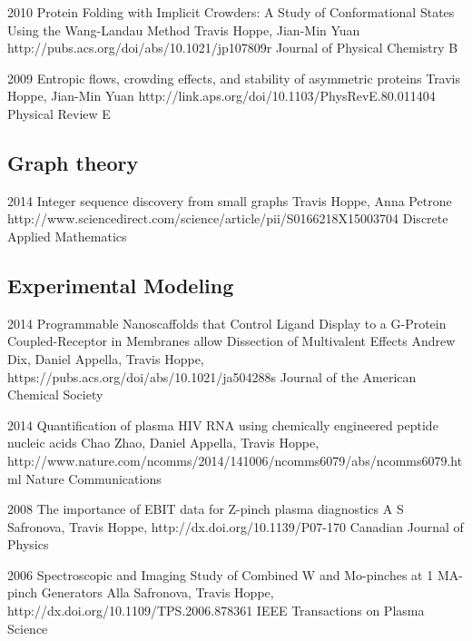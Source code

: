 \documentclass[]{scrartcl}
\begin{document}
\begin{cleanCV}
\Paper
{2010}
{Protein Folding with Implicit Crowders: 
  A Study of Conformational States Using the Wang-Landau Method}
{Travis Hoppe, Jian-Min Yuan}
{http://pubs.acs.org/doi/abs/10.1021/jp107809r}
{Journal of Physical Chemistry B}


\Paper
{2009}
{Entropic flows, crowding effects, and stability of asymmetric proteins}
{Travis Hoppe, Jian-Min Yuan}
{http://link.aps.org/doi/10.1103/PhysRevE.80.011404}
{Physical Review E}


\subsection{Graph theory}

\Paper
{2014}
{Integer sequence discovery from small graphs}
{Travis Hoppe, Anna Petrone}
{http://www.sciencedirect.com/science/article/pii/S0166218X15003704}
{Discrete Applied Mathematics}

\subsection{Experimental Modeling}

\Paper
{2014}
{Programmable Nanoscaffolds that Control Ligand Display to a G-Protein Coupled-Receptor in Membranes allow Dissection of Multivalent Effects}
{Andrew Dix, Daniel Appella, Travis Hoppe, \etal}
{https://pubs.acs.org/doi/abs/10.1021/ja504288s}
{Journal of the American Chemical Society}

\Paper
{2014}
{Quantification of plasma HIV RNA using chemically engineered peptide nucleic acids}
{Chao Zhao, Daniel Appella, Travis Hoppe, \etal}
{http://www.nature.com/ncomms/2014/141006/ncomms6079/abs/ncomms6079.html}
{Nature Communications}

\Paper
{2008}
{The importance of EBIT data for Z-pinch plasma diagnostics}
{A S Safronova, Travis Hoppe, \etal}
{http://dx.doi.org/10.1139/P07-170}
{Canadian Journal of Physics}

\Paper
{2006}
{Spectroscopic and Imaging Study of Combined W and Mo-pinches 
  at 1 MA-pinch Generators}
{Alla Safronova, Travis Hoppe, \etal}
{http://dx.doi.org/10.1109/TPS.2006.878361}
{IEEE Transactions on Plasma Science}





\end{cleanCV}
\end{document}
